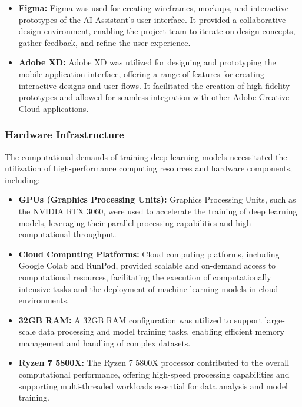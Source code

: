
\begin{itemize}
    \item \textbf{Figma:} Figma was used for creating wireframes, mockups, and interactive prototypes of the AI Assistant's user interface. It provided a collaborative design environment, enabling the project team to iterate on design concepts, gather feedback, and refine the user experience.
    \item \textbf{Adobe XD:} Adobe XD was utilized for designing and prototyping the mobile application interface, offering a range of features for creating interactive designs and user flows. It facilitated the creation of high-fidelity prototypes and allowed for seamless integration with other Adobe Creative Cloud applications.
\end{itemize}


\subsubsection{Hardware Infrastructure}
The computational demands of training deep learning models necessitated the utilization of high-performance computing resources and hardware components, including:

\begin{itemize}
    \item \textbf{GPUs (Graphics Processing Units):} Graphics Processing Units, such as the NVIDIA RTX 3060, were used to accelerate the training of deep learning models, leveraging their parallel processing capabilities and high computational throughput.

    \item \textbf{Cloud Computing Platforms:} Cloud computing platforms, including Google Colab and RunPod, provided scalable and on-demand access to computational resources, facilitating the execution of computationally intensive tasks and the deployment of machine learning models in cloud environments.

    \item \textbf{32GB RAM:} A 32GB RAM configuration was utilized to support large-scale data processing and model training tasks, enabling efficient memory management and handling of complex datasets.

    \item \textbf{Ryzen 7 5800X:} The Ryzen 7 5800X processor contributed to the overall computational performance, offering high-speed processing capabilities and supporting multi-threaded workloads essential for data analysis and model training.
\end{itemize}

